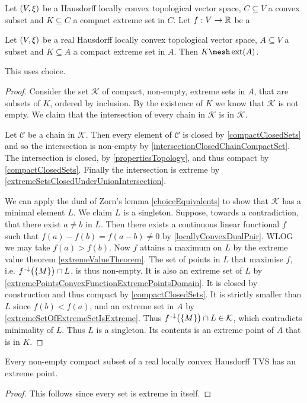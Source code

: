 \begin{lemma}
Let $\sSet{V,\xi}$ be a Hausdorff locally convex topological vector space, $C\subseteq V$ a convex subset and $K\subseteq C$ a compact extreme set in $C$. Let $f: V\to \mathbb{R}$ be a 
\end{lemma}

\begin{lemma} \label{compactExtremeSetContainsExtremePoint}
Let $\sSet{V,\xi}$ be a real Hausdorff locally convex topological vector space, $A\subseteq V$ a subset and $K\subseteq A$ a compact extreme set in $A$. Then $K \mesh \ext(A)$.
\end{lemma}
This uses choice.
\begin{proof}
Consider the set $\mathcal{K}$ of compact, non-empty, extreme sets in $A$, that are subsets of $K$, ordered by inclusion. By the existence of $K$ we know that $\mathcal{K}$ is not empty. We claim that the intersection of every chain in $\mathcal{K}$ is in $\mathcal{K}$.

Let $\mathcal{C}$ be a chain in $\mathcal{K}$. Then every element of $\mathcal{C}$ is closed by \ref{compactClosedSets} and so the intersection is non-empty by \ref{intersectionClosedChainCompactSet}. The intersection is closed, by \ref{propertiesTopology}, and thus compact by \ref{compactClosedSets}. Finally the intersection is extreme by \ref{extremeSetsClosedUnderUnionIntersection}.

We can apply the dual of Zorn's lemma \ref{choiceEquivalents} to show that $\mathcal{K}$ has a minimal element $L$. We claim $L$ is a singleton. Suppose, towards a contradiction, that there exist $a\neq b$ in $L$. Then there exists a continuous linear functional $f$ such that $f(a) - f(b) = f(a - b) \neq 0$ by \ref{locallyConvexDualPair}. WLOG we may take $f(a) > f(b)$. Now $f$ attains a maximum on $L$ by the extreme value theorem \ref{extremeValueTheorem}. The set of points in $L$ that maximise $f$, i.e. $f^{{\text{\hspace{0.15em}-}\downarrow}}\big(\{M\}\big)\cap L$, is thus non-empty. It is also an extreme set of $L$ by \ref{extremePointsConvexFunctionExtremePointsDomain}. It is closed by construction and thus compact by \ref{compactClosedSets}. It is strictly smaller than $L$ since $f(b) < f(a)$, and an extreme set in $A$ by \ref{extremeSetOfExtremeSetIsExtreme}. Thus $f^{{\text{\hspace{0.15em}-}\downarrow}}\big(\{M\}\big)\cap L \in \mathcal{K}$, which contradicts minimality of $L$. Thus $L$ is a singleton. Its contents is an extreme point of $A$ that is in $K$.
\end{proof}
\begin{corollary}
Every non-empty compact subset of a real locally convex Hausdorff
TVS has an extreme point.
\end{corollary}
\begin{proof}
This follows since every set is extreme in itself.
\end{proof}

